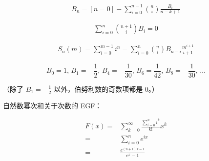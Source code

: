 \documentclass[a4paper, twoside]{article}
\begin{document}
        $$ \begin{aligned}B_n=[n=0]-\sum_{i=0}^{n-1} \binom{n}{i} \frac{B_i}{n-k+1}\end{aligned} $$
        
        $$ \begin{aligned}\sum_{i=0}^n\binom{n+1}{i}B_i=0\end{aligned} $$
        
        $$ \begin{aligned}S_n(m)=\sum_{i=0}^{m-1}i^n=\sum_{i=0}^n\binom{n}{i}B_{n-i}\frac{m^{i+1}}{i+1}\end{aligned} $$
        
        $$ B_0 = 1,\, B_1 = -\frac 1 2,\, B_4 = -\frac 1 {30},\, B_6 = \frac 1 {42},\, B_8 = -\frac 1{30},\, \dots $$
        
        （除了 $B_1 = -\frac 1 2$ 以外，伯努利数的奇数项都是 $0$。）
        
        自然数幂次和关于次数的 EGF：
        
        $$ \begin{aligned} F(x)=&\sum_{k=0}^\infty \frac{\sum_{i=0}^n i^k}{k!}x^k\\ =&\sum_{i=0}^n e^{ix}\\ =&\frac{e^{(n+1)x-1}}{e^x-1} \end{aligned} $$
        
\end{document}

